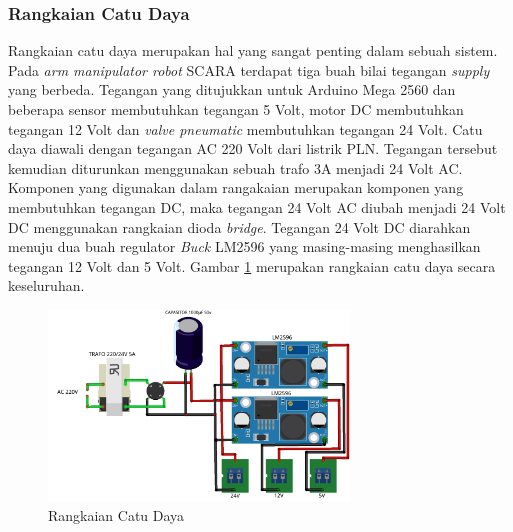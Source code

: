\subsubsection{Rangkaian Catu Daya}
Rangkaian catu daya merupakan hal yang sangat penting dalam sebuah sistem. Pada \textit{arm manipulator robot} SCARA terdapat tiga buah bilai tegangan \textit{supply} yang berbeda. Tegangan yang ditujukkan untuk Arduino Mega 2560 dan beberapa sensor membutuhkan tegangan 5 Volt, motor DC membutuhkan tegangan 12 Volt dan \textit{valve pneumatic} membutuhkan tegangan 24 Volt. Catu daya diawali dengan tegangan AC 220 Volt dari listrik PLN. Tegangan tersebut kemudian diturunkan menggunakan sebuah trafo 3A menjadi 24 Volt AC. Komponen yang digunakan dalam rangakaian merupakan komponen yang membutuhkan tegangan DC, maka tegangan 24 Volt AC diubah menjadi 24 Volt DC menggunakan rangkaian dioda \textit{bridge}. Tegangan 24 Volt DC diarahkan menuju dua buah regulator \textit{Buck} LM2596 yang masing-masing menghasilkan tegangan 12 Volt dan 5 Volt. Gambar \ref{pic.skematikcatu} merupakan rangkaian catu daya secara keseluruhan.
\begin{figure}[H]
	\centering
	\includegraphics[width=8cm]{gambar/catudaya_bb.png}
	\caption{Rangkaian Catu Daya}
	\label{pic.skematikcatu}
\end{figure}
